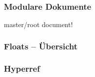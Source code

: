 \documentclass{beamer}                %
\begin{document}
\begin{frame} %
    \frametitle{Modulare Dokumente}
    master/root document!
\end{frame}


\begin{frame} %
    \frametitle{Floats -- \"Ubersicht}
\end{frame}%


\begin{frame} %
    \frametitle{Hyperref}
\end{frame}%

\end{document}
